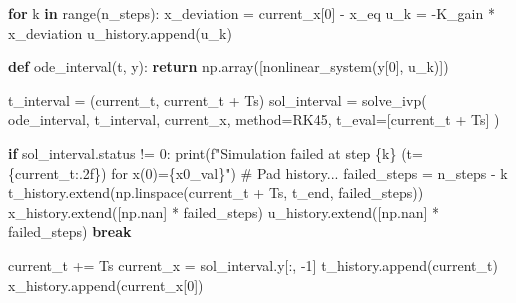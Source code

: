 \documentclass[
  letterpaper,
  DIV=11,
  numbers=noendperiod,
  oneside]{scrartcl}
\newenvironment{Shaded}{\begin{snugshade}}{\end{snugshade}}
\newcommand{\BuiltInTok}[1]{\textcolor[rgb]{0.00,0.23,0.31}{#1}}
\newcommand{\CommentTok}[1]{\textcolor[rgb]{0.37,0.37,0.37}{#1}}
\newcommand{\ControlFlowTok}[1]{\textcolor[rgb]{0.00,0.23,0.31}{\textbf{#1}}}
\newcommand{\DecValTok}[1]{\textcolor[rgb]{0.68,0.00,0.00}{#1}}
\newcommand{\KeywordTok}[1]{\textcolor[rgb]{0.00,0.23,0.31}{\textbf{#1}}}
\newcommand{\NormalTok}[1]{\textcolor[rgb]{0.00,0.23,0.31}{#1}}
\newcommand{\OperatorTok}[1]{\textcolor[rgb]{0.37,0.37,0.37}{#1}}
\newcommand{\SpecialCharTok}[1]{\textcolor[rgb]{0.37,0.37,0.37}{#1}}
\newcommand{\SpecialStringTok}[1]{\textcolor[rgb]{0.13,0.47,0.30}{#1}}
\newcommand{\StringTok}[1]{\textcolor[rgb]{0.13,0.47,0.30}{#1}}
\begin{document}
\begin{Shaded}
\begin{Highlighting}[numbers=left,,]
    \ControlFlowTok{for}\NormalTok{ k }\KeywordTok{in} \BuiltInTok{range}\NormalTok{(n\_steps):}
\NormalTok{        x\_deviation }\OperatorTok{=}\NormalTok{ current\_x[}\DecValTok{0}\NormalTok{] }\OperatorTok{{-}}\NormalTok{ x\_eq}
\NormalTok{        u\_k }\OperatorTok{=} \OperatorTok{{-}}\NormalTok{K\_gain }\OperatorTok{*}\NormalTok{ x\_deviation}
\NormalTok{        u\_history.append(u\_k)}

        \KeywordTok{def}\NormalTok{ ode\_interval(t, y):}
            \ControlFlowTok{return}\NormalTok{ np.array([nonlinear\_system(y[}\DecValTok{0}\NormalTok{], u\_k)])}

\NormalTok{        t\_interval }\OperatorTok{=}\NormalTok{ (current\_t, current\_t }\OperatorTok{+}\NormalTok{ Ts)}
\NormalTok{        sol\_interval }\OperatorTok{=}\NormalTok{ solve\_ivp(}
\NormalTok{            ode\_interval, t\_interval, current\_x, method}\OperatorTok{=}\StringTok{\textquotesingle{}RK45\textquotesingle{}}\NormalTok{,}
\NormalTok{            t\_eval}\OperatorTok{=}\NormalTok{[current\_t }\OperatorTok{+}\NormalTok{ Ts]}
\NormalTok{        )}

        \ControlFlowTok{if}\NormalTok{ sol\_interval.status }\OperatorTok{!=} \DecValTok{0}\NormalTok{:}
            \BuiltInTok{print}\NormalTok{(}\SpecialStringTok{f"Simulation failed at step }\SpecialCharTok{\{}\NormalTok{k}\SpecialCharTok{\}}\SpecialStringTok{ (t=}\SpecialCharTok{\{}\NormalTok{current\_t}\SpecialCharTok{:.2f\}}\SpecialStringTok{) for x(0)=}\SpecialCharTok{\{}\NormalTok{x0\_val}\SpecialCharTok{\}}\SpecialStringTok{"}\NormalTok{)}
            \CommentTok{\# Pad history...}
\NormalTok{            failed\_steps }\OperatorTok{=}\NormalTok{ n\_steps }\OperatorTok{{-}}\NormalTok{ k}
\NormalTok{            t\_history.extend(np.linspace(current\_t }\OperatorTok{+}\NormalTok{ Ts, t\_end, failed\_steps))}
\NormalTok{            x\_history.extend([np.nan] }\OperatorTok{*}\NormalTok{ failed\_steps)}
\NormalTok{            u\_history.extend([np.nan] }\OperatorTok{*}\NormalTok{ failed\_steps)}
            \ControlFlowTok{break}

\NormalTok{        current\_t }\OperatorTok{+=}\NormalTok{ Ts}
\NormalTok{        current\_x }\OperatorTok{=}\NormalTok{ sol\_interval.y[:, }\OperatorTok{{-}}\DecValTok{1}\NormalTok{]}
\NormalTok{        t\_history.append(current\_t)}
\NormalTok{        x\_history.append(current\_x[}\DecValTok{0}\NormalTok{])}


\end{Highlighting}
\end{Shaded}
\end{document}
